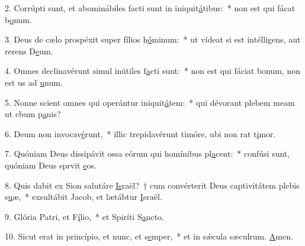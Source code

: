 2. Corrúpti sunt, et abominábiles facti sunt in iniquit\uline{á}tibus:~* non est qui fácat b\uline{o}num.\par 
3. Deus de cælo prospéxit super fílios h\uline{ó}minum:~* ut vídeat si est intélligens, aut rerens D\uline{e}um.\par 
4. Omnes declinavérunt simul inútiles f\uline{a}cti sunt:~* non est qui fáciat bonum, non est us ad \uline{u}num.\par 
5. Nonne scient omnes qui operántur iniquit\uline{á}tem:~* qui dévorant plebem meam ut cbum p\uline{a}nis?\par 
6. Deum non invocav\uline{é}runt,~* illic trepidavérunt timóre, ubi non rat t\uline{i}mor.\par 
7. Quóniam Deus dissipávit ossa eórum qui homínibus pl\uline{a}cent:~* confúsi sunt, quóniam Deus sprvit \uline{e}os.\par 
8. Quis dabit ex Sion salutáre \uline{Is}raël?~† cum convérterit Deus captivitátem plebis s\uline{u}æ,~* exsultábit Jacob, et lætábtur \uline{I}sraël.\par 
9. Glória Patri, et F\uline{í}lio,~* et Spiríti S\uline{a}ncto.\par 
10. Sicut erat in princípio, et nunc, et s\uline{e}mper,~* et in sǽcula sæculrum. \uline{A}men.\par 
